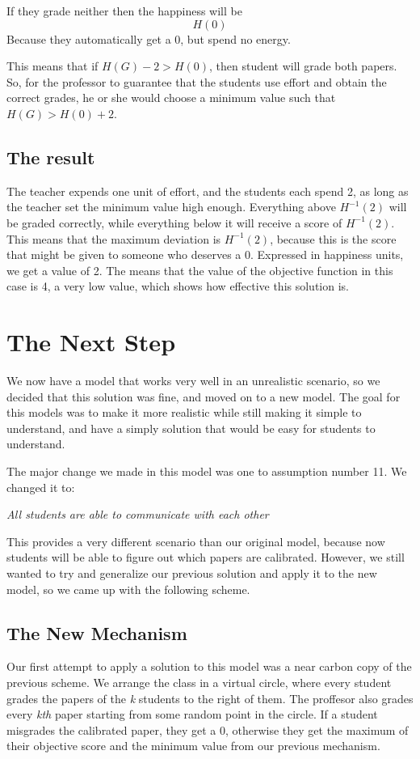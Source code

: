 \documentclass[12pt, Helvetica]{article}
\begin{document}
If they grade neither then the happiness will be $$H(0)$$ Because they automatically get a 0, but spend no energy.

This means that if $H(G) - 2 > H(0)$, then student will grade both papers. So, for the professor to guarantee that the students use effort and obtain the correct grades, he or she would choose a minimum value such that $H(G) > H(0) + 2$.
\subsection{The result}
The teacher expends one unit of effort, and the students each spend 2, as long as the teacher set the minimum value high enough.
Everything above $H^{-1}(2)$ will be graded correctly, while everything below it will receive a score of $H^{-1}(2)$.
This means that the maximum deviation is $H^{-1}(2)$, because this is the score that might be given to someone who deserves a 0. Expressed in happiness units, we get a value of 2.
The means that the value of the objective function in this case is 4, a very low value, which shows how effective this solution is.
\section{The Next Step}
We now have a model that works very well in an unrealistic scenario, so we decided that this solution was fine, and moved on to a new model. The goal for this models was to make it more realistic while still making it simple to understand, and have a simply solution that would be easy for students to understand. 

The major change we made in this model was one to assumption number 11. We changed it to:

\emph{All students are able to communicate with each other}

This provides a very different scenario than our original model, because now students will be able to figure out which papers are calibrated. However, we still wanted to try and generalize our previous solution and apply it to the new model, so we came up with the following scheme.
\subsection{The New Mechanism}
Our first attempt to apply a solution to this model was a near carbon copy of the previous scheme.
We arrange the class in a virtual circle, where every student grades the papers of the \emph{k} students to the right of them. The proffesor also grades every \emph{kth} paper starting from some random point in the circle. If a student misgrades the calibrated paper, they get a 0, otherwise they get the maximum of their objective score and the minimum value from our previous mechanism.
\end{document}
